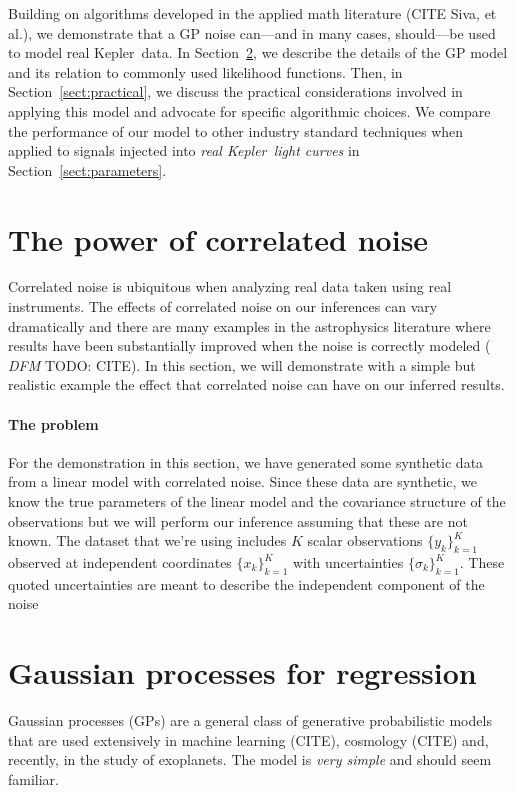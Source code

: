 \documentclass[12pt,preprint]{aastex}
\newcommand{\project}[1]{{\sffamily #1}}
\newcommand{\kepler}{\project{Kepler}}
\newcommand{\Sect}[1]{Section~\ref{sect:#1}}
\newcommand{\sect}[1]{\Sect{#1}}
\newcommand{\sectlabel}[1]{\label{sect:#1}}
\newcommand{\todo}[3]{{\color{#2} \emph{#1} TODO: #3}}
\newcommand{\dfmtodo}[1]{\todo{DFM}{red}{#1}}
\begin{document}
Building on algorithms developed in the applied math literature (CITE Siva, et
al.), we demonstrate that a GP noise can---and in many cases, should---be
used to model real \kepler\ data.
In \sect{gps}, we describe the details of the GP model and its relation to
commonly used likelihood functions.
Then, in \sect{practical}, we discuss the practical considerations involved in
applying this model and advocate for specific algorithmic choices.
We compare the performance of our model to other industry standard techniques
when applied to signals injected into \emph{real \kepler\ light curves} in
\sect{parameters}.

\section{The power of correlated noise}
\sectlabel{corr-noise}

Correlated noise is ubiquitous when analyzing real data taken using real
instruments.
The effects of correlated noise on our inferences can vary dramatically and
there are many examples in the astrophysics literature where results have been
substantially improved when the noise is correctly modeled (\dfmtodo{CITE}).
In this section, we will demonstrate with a simple but realistic example the
effect that correlated noise can have on our inferred results.

\paragraph{The problem}
For the demonstration in this section, we have generated some synthetic data
from a linear model with correlated noise.
Since these data are synthetic, we know the true parameters of the linear
model and the covariance structure of the observations but we will perform our
inference assuming that these are not known.
The dataset that we're using includes $K$ scalar observations
$\{y_k\}_{k=1}^K$ observed at independent coordinates $\{x_k\}_{k=1}^K$ with
uncertainties $\{\sigma_k\}_{k=1}^K$.
These quoted uncertainties are meant to describe the independent component of
the noise

\section{Gaussian processes for regression}\sectlabel{gps}

Gaussian processes (GPs) are a general class of generative probabilistic
models that are used extensively in machine learning (CITE), cosmology (CITE)
and, recently, in the study of exoplanets.
The model is \emph{very simple} and should seem familiar.
\end{document}

